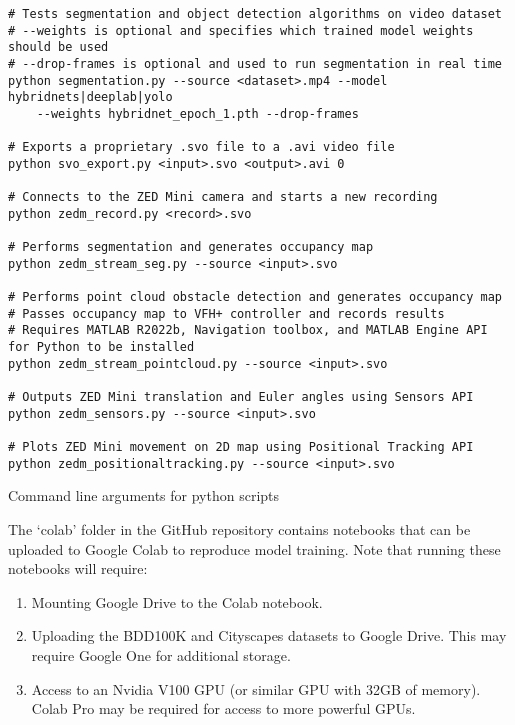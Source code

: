 \begin{listing}[H]
\begin{verbatim}
# Tests segmentation and object detection algorithms on video dataset
# --weights is optional and specifies which trained model weights should be used
# --drop-frames is optional and used to run segmentation in real time
python segmentation.py --source <dataset>.mp4 --model hybridnets|deeplab|yolo
    --weights hybridnet_epoch_1.pth --drop-frames

# Exports a proprietary .svo file to a .avi video file
python svo_export.py <input>.svo <output>.avi 0

# Connects to the ZED Mini camera and starts a new recording
python zedm_record.py <record>.svo

# Performs segmentation and generates occupancy map
python zedm_stream_seg.py --source <input>.svo

# Performs point cloud obstacle detection and generates occupancy map
# Passes occupancy map to VFH+ controller and records results
# Requires MATLAB R2022b, Navigation toolbox, and MATLAB Engine API for Python to be installed
python zedm_stream_pointcloud.py --source <input>.svo

# Outputs ZED Mini translation and Euler angles using Sensors API
python zedm_sensors.py --source <input>.svo

# Plots ZED Mini movement on 2D map using Positional Tracking API
python zedm_positionaltracking.py --source <input>.svo
\end{verbatim}
\caption{Command line arguments for python scripts}
\label{lst:script_examples}
\end{listing}

The `colab' folder in the GitHub repository contains notebooks that
can be uploaded to Google Colab to reproduce model training.
Note that running these notebooks will require:
\begin{enumerate}
    \item Mounting Google Drive to the Colab notebook.
    \item Uploading the BDD100K and Cityscapes datasets to Google Drive. This may require Google One for additional storage.
    \item Access to an Nvidia V100 GPU (or similar GPU with 32GB of memory). Colab Pro may be required for access to more powerful GPUs.
\end{enumerate}
